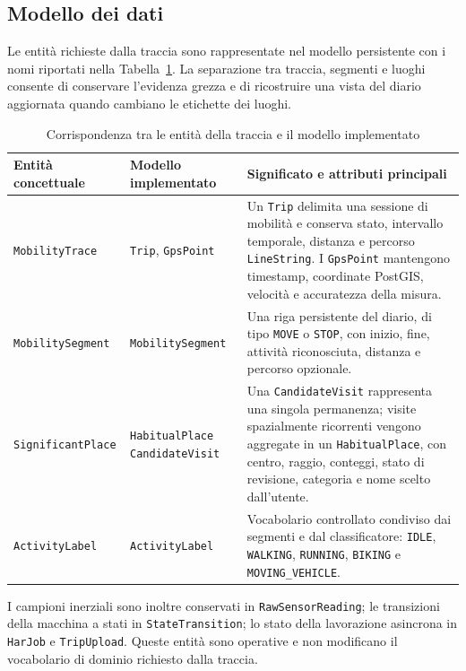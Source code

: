 \documentclass[conference]{IEEEtran}
\begin{document}
\subsection{Modello dei dati}

Le entità richieste dalla traccia sono rappresentate nel modello
persistente con i nomi riportati nella Tabella~\ref{tab:domain-model}.
La separazione tra traccia, segmenti e luoghi consente di conservare
l'evidenza grezza e di ricostruire una vista del diario aggiornata
quando cambiano le etichette dei luoghi.

\begin{table}[htbp]
\caption{Corrispondenza tra le entità della traccia e il modello implementato}
\centering
\scriptsize
\begin{tabular}{|p{2.7cm}|p{3.7cm}|p{9.2cm}|}
\hline
\textbf{Entità concettuale} & \textbf{Modello implementato} & \textbf{Significato e attributi principali} \\
\hline
\texttt{MobilityTrace} & \texttt{Trip}, \texttt{GpsPoint} &
Un \texttt{Trip} delimita una sessione di mobilità e conserva stato,
intervallo temporale, distanza e percorso \texttt{LineString}.
I \texttt{GpsPoint} mantengono timestamp, coordinate PostGIS, velocità e
accuratezza della misura. \\
\hline
\texttt{MobilitySegment} & \texttt{MobilitySegment} &
Una riga persistente del diario, di tipo \texttt{MOVE} o \texttt{STOP},
con inizio, fine, attività riconosciuta, distanza e percorso opzionale. \\
\hline
\texttt{SignificantPlace} & \texttt{HabitualPlace}  \texttt{CandidateVisit} &
Una \texttt{CandidateVisit} rappresenta una singola permanenza; visite
spazialmente ricorrenti vengono aggregate in un \texttt{HabitualPlace},
con centro, raggio, conteggi, stato di revisione, categoria e nome scelto
dall'utente. \\
\hline
\texttt{ActivityLabel} & \texttt{ActivityLabel} &
Vocabolario controllato condiviso dai segmenti e dal classificatore:
\texttt{IDLE}, \texttt{WALKING}, \texttt{RUNNING}, \texttt{BIKING} e
\texttt{MOVING\_VEHICLE}. \\
\hline
\end{tabular}
\label{tab:domain-model}
\end{table}

I campioni inerziali sono inoltre conservati in
\texttt{RawSensorReading}; le transizioni della macchina a stati in
\texttt{StateTransition}; lo stato della lavorazione asincrona in
\texttt{HarJob} e \texttt{TripUpload}. Queste entità sono operative e
non modificano il vocabolario di dominio richiesto dalla traccia.
\end{document}
